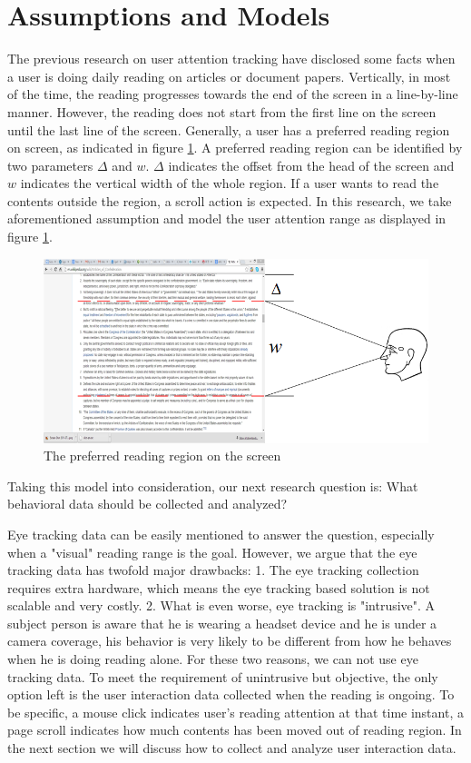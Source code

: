 \documentclass{sigchi}
\begin{document}
\section{Assumptions and Models}
The previous research on user attention tracking \cite{buscher2010eye} have disclosed some facts when a user is doing daily reading on 
 articles or document papers. Vertically, in most of the time, the reading progresses towards the end of the screen  in a line-by-line manner. 
However, the reading does not start from the first line on the screen until the last line of the screen. Generally, a user has a preferred reading region on screen,
as indicated in figure \ref{fig:read_region}. A preferred reading region can be identified by two parameters $\Delta$ and $w$. $\Delta$  indicates the 
offset from the head of the screen and $w$ indicates the vertical width of the whole region. If a user wants to read the contents outside the region,
a scroll action is expected. In this research, we take aforementioned assumption and model the user attention range as displayed in figure \ref{fig:read_region}. 



\begin{figure}[!h]
\centering
\includegraphics[width=0.9\columnwidth]{preferred_reigon}
\caption{The preferred reading region on the screen}
\label{fig:read_region}
\end{figure}



Taking this model into consideration, our next  research question is: 
What behavioral data should be collected and analyzed?


Eye tracking data can be easily mentioned to answer the question, especially when a "visual" reading range is 
the goal. However, we argue that the eye tracking data has twofold major drawbacks: 1. The eye tracking collection 
requires extra hardware, which means the eye tracking  based solution  is not scalable and very costly. 2. What is even worse, 
eye tracking is "intrusive". A subject person is aware that he is wearing a headset device and he is under a camera coverage, 
his behavior is very likely to be different from how he behaves when he is doing reading alone. For these two reasons, we 
can not use eye tracking data. To meet the requirement of unintrusive but objective, the only option left is the user interaction data 
collected when the reading is ongoing. To be specific, a mouse click indicates user's reading attention at that time instant, a page scroll indicates
how much contents has been moved out of reading region. In the next section we will discuss how to 
collect and analyze user interaction data. 
\end{document}
